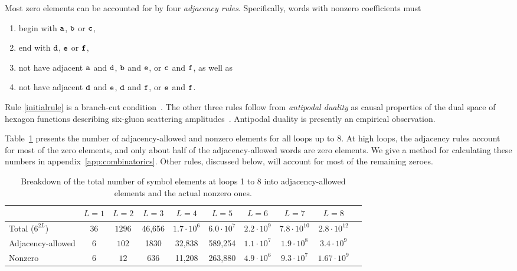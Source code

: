 \documentclass[12pt]{article}
\begin{document}
Most zero elements can be accounted for by four \emph{adjacency rules}.  Specifically, words with nonzero coefficients must
%
\begin{enumerate}[label=(\roman*),nosep]
\item begin with $\tt a$, $\tt b$ or $\tt c$, \label{initialrule}
\item end with $\tt d$, $\tt e$ or $\tt f$, \label{finalrule}
\item not have adjacent $\tt a$ and $\tt d$, $\tt b$ and $\tt e$, or $\tt c$ and $\tt f$, \label{firstadjacency} as well as
\item not have adjacent $\tt d$ and $\tt e$, $\tt d$ and $\tt f$, or $\tt e$ and $\tt f$. \label{secondadjacency}
\end{enumerate}
%
Rule \ref{initialrule} is a branch-cut condition~\citep{Dixon:2022rse}.  The other three rules follow from \emph{antipodal duality} \citep{Dixon:2021tdw} as causal properties of the dual space of hexagon functions describing six-gluon scattering amplitudes~\citep{Dixon:2011pw,Dixon:2013eka,Caron-Huot:2019bsq}.  Antipodal duality is presently an empirical observation.

Table~\ref{tab:elem_count1} presents the number of adjacency-allowed and nonzero elements for all loops up to $8$. At high loops, the adjacency rules account for most of the zero elements, and only about half of the adjacency-allowed words are zero elements. We give a method for calculating these numbers in appendix~\ref{app:combinatorics}.  Other rules, discussed below, will account for most of the remaining zeroes.


\begin{table}[t]
    \small
    \centering
    \begin{tabular}{lccccccccc}
        \toprule
        & $L=1$ & $L=2$ & $L=3$ & $L=4$ & $L=5$ & $L=6$ & $L=7$ & $L=8$  \\
        \midrule
        Total ($6^{2L}$) & $36$ & $1296$ & 46,656 & $1.7\cdot 10^6$ & $6.0\cdot 10^7$ & $2.2 \cdot 10^9$ & $7.8\cdot 10^{10}$ & $2.8\cdot 10^{12}$\\
        Adjacency-allowed & $6$ & $102$ & 1830 & 32,838 & 589,254 & $1.1\cdot 10^7$ & $1.9\cdot 10^8$ & $3.4\cdot 10^9 $\\
        Nonzero & $6$ & $12$ & $636$ & 11,208 & 263,880 & $4.9\cdot 10^6$ & $9.3\cdot 10^7$ & $1.67\cdot 10^9$\\
       \bottomrule
    \end{tabular}
    \caption{\small Breakdown of the total number of symbol elements at loops 1 to 8 into adjacency-allowed elements and the actual nonzero ones.}
    \label{tab:elem_count1}
\end{table}
\end{document}
